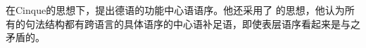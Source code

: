  \citet{Laenzlinger2004a}在Cinque的思想下，提出德语的功能中心语语序。他还采用了 \citet{Kayne94a-u}的思想，他认为所有的句法结构都有跨语言的具体语序的中心语补足语，即使表层语序看起来是与之矛盾的。

